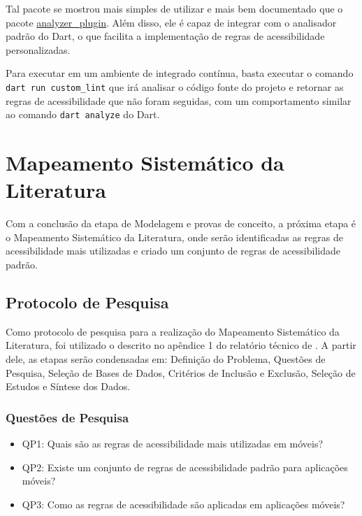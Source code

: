 Tal pacote se mostrou mais simples de utilizar e mais bem documentado que o pacote \href{https://pub.dev/packages/analyzer_plugin}{analyzer\_plugin}. Além disso, ele é capaz de integrar com o analisador padrão do Dart, o que facilita a implementação de regras de acessibilidade personalizadas. 

Para executar em um ambiente de integrado contínua, basta executar o comando \texttt{dart run custom\_lint} que irá analisar o código fonte do projeto e retornar as regras de acessibilidade que não foram seguidas, com um comportamento similar ao comando \texttt{dart analyze} do Dart.

\section{Mapeamento Sistemático da Literatura}\label{sec:msl}

Com a conclusão da etapa de Modelagem e provas de conceito, a próxima etapa é o Mapeamento Sistemático da Literatura, onde serão identificadas as regras de acessibilidade mais utilizadas e criado um conjunto de regras de acessibilidade padrão.

\subsection{Protocolo de Pesquisa}

Como protocolo de pesquisa para a realização do Mapeamento Sistemático da Literatura, foi utilizado o descrito no apêndice 1 do relatório técnico de \cite{srufrj}. A partir dele, as etapas serão condensadas em: Definição do Problema, Questões de Pesquisa, Seleção de Bases de Dados, Critérios de Inclusão e Exclusão, Seleção de Estudos e Síntese dos Dados.

\subsubsection{Questões de Pesquisa}

\begin{itemize}
	\item QP1: Quais são as regras de acessibilidade mais utilizadas em móveis?
	\item QP2: Existe um conjunto de regras de acessibilidade padrão para aplicações móveis?
	\item QP3: Como as regras de acessibilidade são aplicadas em aplicações móveis?
\end{itemize}

